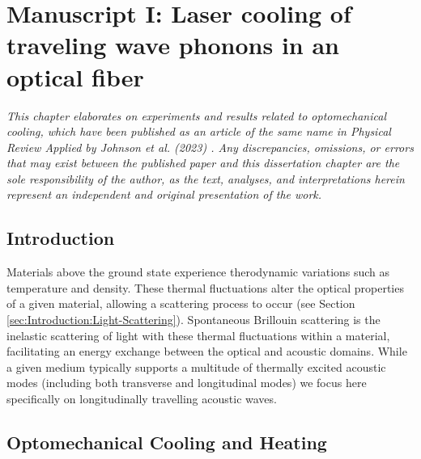 \setcounter{rownumber}{0}
\chapter{Manuscript I: Laser cooling of traveling wave phonons in an optical fiber}
\label{ch:Cooling}
\acresetall

\textit{This chapter elaborates on experiments and results related to optomechanical cooling, which have been published as an article of the same name in Physical Review Applied by Johnson et al. (2023) \cite{johnson2023laser}. Any discrepancies, omissions, or errors that may exist between the published paper and this dissertation chapter are the sole responsibility of the author, as the text, analyses, and interpretations herein represent an independent and original presentation of the work.}


\section{Introduction}
\label{sec:Cooling:Introduction}

Materials above the ground state experience therodynamic variations such as temperature and density. These thermal fluctuations alter the optical properties of a given material, allowing a scattering process to occur (see Section \ref{sec:Introduction:Light-Scattering}).  Spontaneous Brillouin scattering is the inelastic scattering of light with these thermal fluctuations within a material, facilitating an energy exchange between the optical and acoustic domains. While a given medium typically supports a multitude of thermally excited acoustic modes (including both transverse and longitudinal modes) we focus here specifically on longitudinally travelling acoustic waves.


\section{Optomechanical Cooling and Heating}
\label{sec:Cooling:Cooling-Heating}

